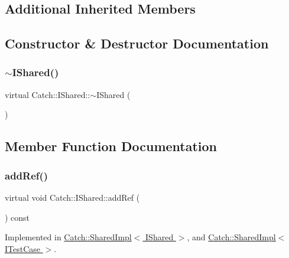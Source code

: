 \subsection*{Additional Inherited Members}


\subsection{Constructor \& Destructor Documentation}
\hypertarget{struct_catch_1_1_i_shared_a5e842e7540ae7ae0c62a2758123503f6}{}\label{struct_catch_1_1_i_shared_a5e842e7540ae7ae0c62a2758123503f6} 
\subsubsection{\texorpdfstring{$\sim$\+I\+Shared()}{~IShared()}}
{\footnotesize\ttfamily virtual Catch\+::\+I\+Shared\+::$\sim$\+I\+Shared (\begin{DoxyParamCaption}{ }\end{DoxyParamCaption})\hspace{0.3cm}{\ttfamily [virtual]}}



\subsection{Member Function Documentation}
\hypertarget{struct_catch_1_1_i_shared_ae383df68557cdaf0910b411af04d9e33}{}\label{struct_catch_1_1_i_shared_ae383df68557cdaf0910b411af04d9e33} 
\subsubsection{\texorpdfstring{add\+Ref()}{addRef()}}
{\footnotesize\ttfamily virtual void Catch\+::\+I\+Shared\+::add\+Ref (\begin{DoxyParamCaption}{ }\end{DoxyParamCaption}) const\hspace{0.3cm}{\ttfamily [pure virtual]}}



Implemented in \hyperlink{struct_catch_1_1_shared_impl_a5d1a4c96e8fc07c821890fd09749062e}{Catch\+::\+Shared\+Impl$<$ I\+Shared $>$}, and \hyperlink{struct_catch_1_1_shared_impl_a5d1a4c96e8fc07c821890fd09749062e}{Catch\+::\+Shared\+Impl$<$ I\+Test\+Case $>$}.

